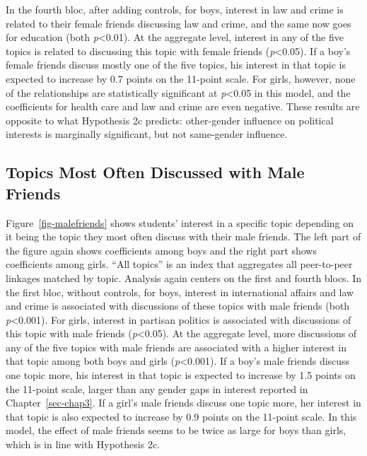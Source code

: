 \documentclass[
  letterpaper,
  DIV=11,
  numbers=noendperiod]{scrreprt}
\begin{document}
In the fourth bloc, after adding controls, for boys, interest in law and
crime is related to their female friends discussing law and crime, and
the same now goes for education (both \emph{p}\textless0.01). At the
aggregate level, interest in any of the five topics is related to
discussing this topic with female friends (\emph{p}\textless0.05). If a
boy's female friends discuss mostly one of the five topics, his interest
in that topic is expected to increase by 0.7 points on the 11-point
scale. For girls, however, none of the relationships are statistically
significant at \emph{p}\textless0.05 in this model, and the coefficients
for health care and law and crime are even negative. These results are
opposite to what Hypothesis 2c predicts: other-gender influence on
political interests is marginally significant, but not same-gender
influence.

\subsection{Topics Most Often Discussed with Male
Friends}\label{topics-most-often-discussed-with-male-friends}

Figure~\ref{fig-malefriends} shows students' interest in a specific
topic depending on it being the topic they most often discuss with their
male friends. The left part of the figure again shows coefficients among
boys and the right part shows coefficients among girls. ``All topics''
is an index that aggregates all peer-to-peer linkages matched by topic.
Analysis again centers on the first and fourth blocs. In the first bloc,
without controls, for boys, interest in international affairs and law
and crime is associated with discussions of these topics with male
friends (both \emph{p}\textless0.001). For girls, interest in partisan
politics is associated with discussions of this topic with male friends
(\emph{p}\textless0.05). At the aggregate level, more discussions of any
of the five topics with male friends are associated with a higher
interest in that topic among both boys and girls
(\emph{p}\textless0.001). If a boy's male friends discuss one topic
more, his interest in that topic is expected to increase by 1.5 points
on the 11-point scale, larger than any gender gaps in interest reported
in Chapter~\ref{sec-chap3}. If a girl's male friends discuss one topic
more, her interest in that topic is also expected to increase by 0.9
points on the 11-point scale. In this model, the effect of male friends
seems to be twice as large for boys than girls, which is in line with
Hypothesis 2c.
\end{document}

